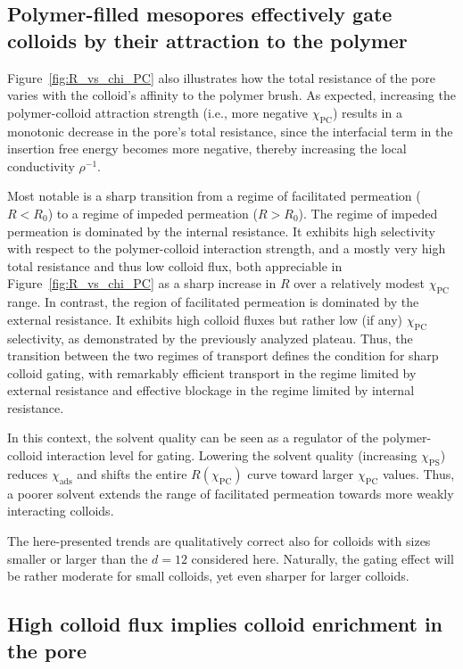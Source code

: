 \documentclass[12pt, a4paper]{article}
\begin{document}
\subsection{Polymer-filled mesopores effectively gate colloids by their attraction to the polymer}

Figure~\ref{fig:R_vs_chi_PC} also illustrates how the total resistance of the pore varies with the colloid's affinity to the polymer brush.
As expected, increasing the polymer-colloid attraction strength (i.e., more negative $\chi_{\text{PC}}$) results in a monotonic decrease in the pore's total resistance, since the interfacial term in the insertion free energy becomes more negative, thereby increasing the local conductivity $\rho^{-1}$.

Most notable is a sharp transition from a regime of facilitated permeation ($R < R_0$) to a regime of impeded permeation ($R > R_0$).
The regime of impeded permeation is dominated by the internal resistance.
It exhibits high selectivity with respect to the polymer-colloid interaction strength, and a mostly very high total resistance and thus low colloid flux, both appreciable in Figure~\ref{fig:R_vs_chi_PC} as a sharp increase in $R$ over a relatively modest $\chi_{\text{PC}}$ range.
In contrast, the region of facilitated permeation is dominated by the external resistance. 
It exhibits high colloid fluxes but rather low (if any) $\chi_{\text{PC}}$ selectivity, as demonstrated by the previously analyzed plateau.
Thus, the transition between the two regimes of transport defines the condition for sharp colloid gating, with remarkably efficient transport in the regime limited by external resistance and effective blockage in the regime limited by internal resistance.

In this context, the solvent quality can be seen as a regulator of the polymer-colloid interaction level for gating. 
Lowering the solvent quality (increasing $\chi_{\text{PS}}$) reduces $\chi_{\text{ads}}$ and shifts the entire $R(\chi_{\text{PC}})$ curve toward larger $\chi_{\text{PC}}$ values.
Thus, a poorer solvent extends the range of facilitated permeation towards more weakly interacting colloids.

The here-presented trends are qualitatively correct also for colloids with sizes smaller or larger than the $d=12$ considered here.
Naturally, the gating effect will be rather moderate for small colloids, yet even sharper for larger colloids.


\subsection{High colloid flux implies colloid enrichment in the pore}
\end{document}
